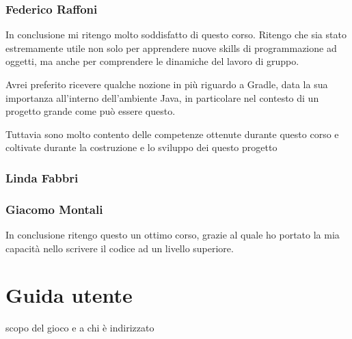 \documentclass[a4paper,12pt]{report}
\begin{document}
\subsection{Federico Raffoni}
In conclusione mi ritengo molto soddisfatto di questo corso. Ritengo che sia stato estremamente utile non solo per apprendere nuove skills di programmazione ad oggetti, ma anche per comprendere le dinamiche del lavoro di gruppo.

Avrei preferito ricevere qualche nozione in più riguardo a Gradle, data la sua importanza all’interno dell’ambiente Java, in particolare nel contesto di un progetto grande come può essere questo.

Tuttavia sono molto contento delle competenze ottenute durante questo corso e coltivate durante la costruzione e lo sviluppo dei questo progetto

\subsection{Linda Fabbri}
\subsection{Giacomo Montali}
In conclusione ritengo questo un ottimo corso, grazie al quale ho portato la mia capacità nello scrivere il codice ad un livello superiore.
\appendix
\chapter{Guida utente}

scopo del gioco e a chi è indirizzato
\end{document}

